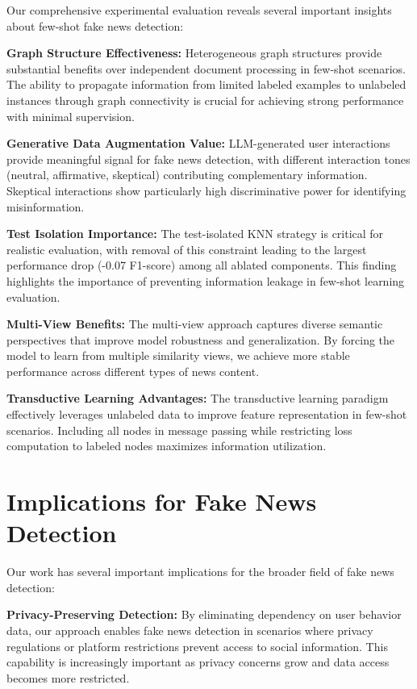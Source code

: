 Our comprehensive experimental evaluation reveals several important insights about few-shot fake news detection:

\textbf{Graph Structure Effectiveness:} Heterogeneous graph structures provide substantial benefits over independent document processing in few-shot scenarios. The ability to propagate information from limited labeled examples to unlabeled instances through graph connectivity is crucial for achieving strong performance with minimal supervision.

\textbf{Generative Data Augmentation Value:} LLM-generated user interactions provide meaningful signal for fake news detection, with different interaction tones (neutral, affirmative, skeptical) contributing complementary information. Skeptical interactions show particularly high discriminative power for identifying misinformation.

\textbf{Test Isolation Importance:} The test-isolated KNN strategy is critical for realistic evaluation, with removal of this constraint leading to the largest performance drop (-0.07 F1-score) among all ablated components. This finding highlights the importance of preventing information leakage in few-shot learning evaluation.

\textbf{Multi-View Benefits:} The multi-view approach captures diverse semantic perspectives that improve model robustness and generalization. By forcing the model to learn from multiple similarity views, we achieve more stable performance across different types of news content.

\textbf{Transductive Learning Advantages:} The transductive learning paradigm effectively leverages unlabeled data to improve feature representation in few-shot scenarios. Including all nodes in message passing while restricting loss computation to labeled nodes maximizes information utilization.

\section{Implications for Fake News Detection}

Our work has several important implications for the broader field of fake news detection:

\textbf{Privacy-Preserving Detection:} By eliminating dependency on user behavior data, our approach enables fake news detection in scenarios where privacy regulations or platform restrictions prevent access to social information. This capability is increasingly important as privacy concerns grow and data access becomes more restricted.

